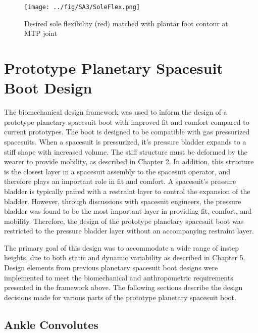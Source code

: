 \documentclass[defaultstyle,11pt]{comps}
\begin{document}
\begin{figure}
\hypertarget{fig:SA3-SoleFlex}{%
\centering
\texttt{[image: ../fig/SA3/SoleFlex.png]}
\caption{Desired sole flexibility (red) matched with plantar foot contour at MTP joint}\label{fig:SA3-SoleFlex}
}
\end{figure}

\hypertarget{prototype-planetary-spacesuit-boot-design}{%
\section{Prototype Planetary Spacesuit Boot Design}\label{prototype-planetary-spacesuit-boot-design}}

The biomechanical design framework was used to inform the design of a prototype planetary spacesuit boot with improved fit and comfort compared to current prototypes.
The boot is designed to be compatible with gas pressurized spacesuits.
When a spacesuit is pressurized, it's pressure bladder expands to a stiff shape with increased volume.
The stiff structure must be deformed by the wearer to provide mobility, as described in Chapter 2.
In addition, this structure is the closest layer in a spacesuit assembly to the spacesuit operator, and therefore plays an important role in fit and comfort.
A spacesuit's pressure bladder is typically paired with a restraint layer to control the expansion of the bladder\citep{Harris2001}.
However, through discussions with spacesuit engineers, the pressure bladder was found to be the most important layer in providing fit, comfort, and mobility.
Therefore, the design of the prototype planetary spacesuit boot was restricted to the pressure bladder layer without an accompanying restraint layer.

The primary goal of this design was to accommodate a wide range of instep heights, due to both static and dynamic variability as described in Chapter 5.
Design elements from previous planetary spacesuit boot designs were implemented to meet the biomechanical and anthropometric requirements presented in the framework above.
The following sections describe the design decisions made for various parts of the prototype planetary spacesuit boot.

\hypertarget{ankle-convolutes}{%
\subsection{Ankle Convolutes}\label{ankle-convolutes}}
\end{document}
